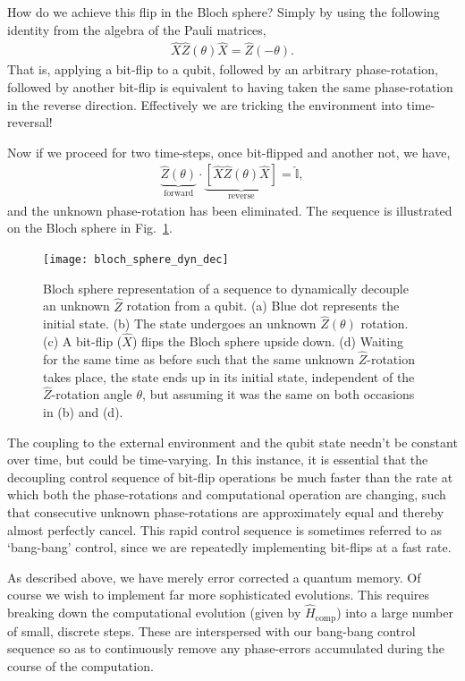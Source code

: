 How do we achieve this flip in the Bloch sphere? Simply by using the following identity from the algebra of the Pauli matrices,
\begin{align}
\hat{X}\hat{Z}(\theta)\hat{X} = 	\hat{Z}(-\theta).
\end{align}
That is, applying a bit-flip to a qubit, followed by an arbitrary phase-rotation, followed by another bit-flip is equivalent to having taken the same phase-rotation in the reverse direction. Effectively we are tricking the environment into time-reversal!

Now if we proceed for two time-steps, once bit-flipped and another not, we have,
\begin{align}
\underbrace{\hat{Z}(\theta)}_{\text{forward}}\cdot\underbrace{[\hat{X}\hat{Z}(\theta)\hat{X}]}_{\text{reverse}} = \hat{\mathbb{I}},
\end{align}
and the unknown phase-rotation has been eliminated. The sequence is illustrated on the Bloch sphere in Fig.~\ref{fig:bloch_sphere_dyn_dec}.

\begin{figure}[!htb]
\texttt{[image: bloch\_sphere\_dyn\_dec]}
\caption{Bloch sphere representation of a sequence to dynamically decouple an unknown $\hat{Z}$ rotation from a qubit. (a) Blue dot represents the initial state. (b) The state undergoes an unknown $\hat{Z}(\theta)$ rotation. (c) A bit-flip ($\hat{X}$) flips the Bloch sphere upside down. (d) Waiting for the same time as before such that the same unknown $\hat{Z}$-rotation takes place, the state ends up in its initial state, independent of the $\hat{Z}$-rotation angle $\theta$, but assuming it was the same on both occasions in (b) and (d).} \label{fig:bloch_sphere_dyn_dec}	
\end{figure}

The coupling to the external environment and the qubit state needn't be constant over time, but could be time-varying. In this instance, it is essential that the decoupling control sequence of bit-flip operations be much faster than the rate at which both the phase-rotations and computational operation are changing, such that consecutive unknown phase-rotations are approximately equal and thereby almost perfectly cancel. This rapid control sequence is sometimes referred to as `bang-bang' control, since we are repeatedly implementing bit-flips at a fast rate. 

As described above, we have merely error corrected a quantum memory. Of course we wish to implement far more sophisticated evolutions. This requires breaking down the computational evolution (given by $\hat{H}_\text{comp}$) into a large number of small, discrete steps. These are interspersed with our bang-bang control sequence so as to continuously remove any phase-errors accumulated during the course of the computation.

